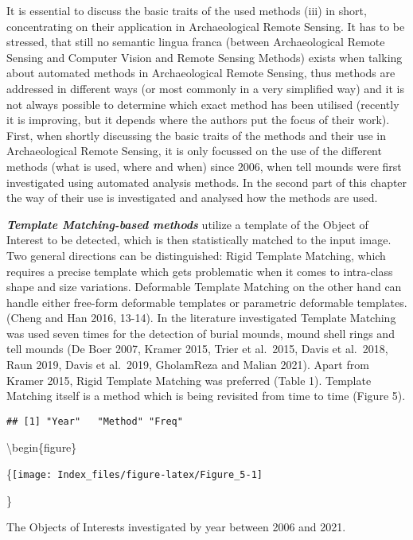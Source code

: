 \documentclass[
]{article}
\begin{document}
It is essential to discuss the basic traits of the used methods (iii) in short, concentrating on their application in Archaeological Remote Sensing. It has to be stressed, that still no semantic lingua franca (between Archaeological Remote Sensing and Computer Vision and Remote Sensing Methods) exists when talking about automated methods in Archaeological Remote Sensing, thus methods are addressed in different ways (or most commonly in a very simplified way) and it is not always possible to determine which exact method has been utilised (recently it is improving, but it depends where the authors put the focus of their work). First, when shortly discussing the basic traits of the methods and their use in Archaeological Remote Sensing, it is only focussed on the use of the different methods (what is used, where and when) since 2006, when tell mounds were first investigated using automated analysis methods. In the second part of this chapter the way of their use is investigated and analysed how the methods are used.

\textbf{\emph{Template Matching-based methods}} utilize a template of the Object of Interest to be detected, which is then statistically matched to the input image. Two general directions can be distinguished: Rigid Template Matching, which requires a precise template which gets problematic when it comes to intra-class shape and size variations. Deformable Template Matching on the other hand can handle either free-form deformable templates or parametric deformable templates. (Cheng and Han 2016, 13-14).
In the literature investigated Template Matching was used seven times for the detection of burial mounds, mound shell rings and tell mounds (De Boer 2007, Kramer 2015, Trier et al.~2015, Davis et al.~2018, Raun 2019, Davis et al.~2019, GholamReza and Malian 2021). Apart from Kramer 2015, Rigid Template Matching was preferred (Table 1). Template Matching itself is a method which is being revisited from time to time (Figure 5).

\begin{verbatim}
## [1] "Year"   "Method" "Freq"
\end{verbatim}

\textbackslash begin\{figure\}

\{\centering \texttt{[image: Index\_files/figure-latex/Figure\_5-1]}

\}

\caption{The Objects of Interests investigated by year between 2006 and 2021.}
\end{document}

